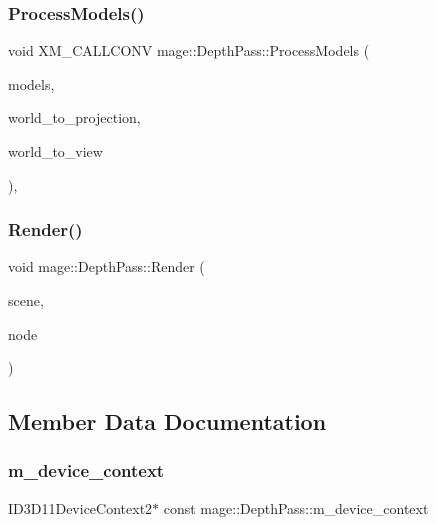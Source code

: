 \subsubsection{\texorpdfstring{Process\+Models()}{ProcessModels()}}
{\footnotesize\ttfamily void X\+M\+\_\+\+C\+A\+L\+L\+C\+O\+NV mage\+::\+Depth\+Pass\+::\+Process\+Models (\begin{DoxyParamCaption}\item[{const vector$<$ const \hyperlink{classmage_1_1_model_node}{Model\+Node} $\ast$ $>$ \&}]{models,  }\item[{F\+X\+M\+M\+A\+T\+R\+IX}]{world\+\_\+to\+\_\+projection,  }\item[{F\+X\+M\+M\+A\+T\+R\+IX}]{world\+\_\+to\+\_\+view }\end{DoxyParamCaption})\hspace{0.3cm}{\ttfamily [private]}, {\ttfamily [noexcept]}}

\hypertarget{classmage_1_1_depth_pass_af4776381c4271e464b0fd72c7437922d}{}\label{classmage_1_1_depth_pass_af4776381c4271e464b0fd72c7437922d} 
\subsubsection{\texorpdfstring{Render()}{Render()}}
{\footnotesize\ttfamily void mage\+::\+Depth\+Pass\+::\+Render (\begin{DoxyParamCaption}\item[{const \hyperlink{structmage_1_1_pass_buffer}{Pass\+Buffer} $\ast$}]{scene,  }\item[{const \hyperlink{classmage_1_1_camera_node}{Camera\+Node} $\ast$}]{node }\end{DoxyParamCaption})}



\subsection{Member Data Documentation}
\hypertarget{classmage_1_1_depth_pass_ab7e627aaf0356349e750e89c6b97c7a0}{}\label{classmage_1_1_depth_pass_ab7e627aaf0356349e750e89c6b97c7a0} 
\subsubsection{\texorpdfstring{m\+\_\+device\+\_\+context}{m\_device\_context}}
{\footnotesize\ttfamily I\+D3\+D11\+Device\+Context2$\ast$ const mage\+::\+Depth\+Pass\+::m\+\_\+device\+\_\+context\hspace{0.3cm}{\ttfamily [private]}}

